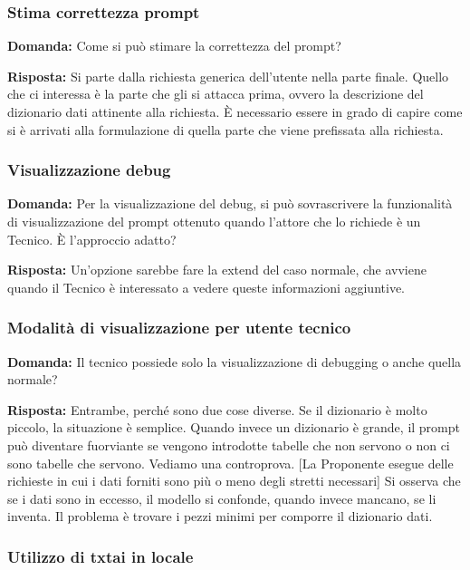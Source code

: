 \subsubsection{Stima correttezza prompt}

\textbf{Domanda:} Come si può stimare la correttezza del prompt?

\textbf{Risposta:} Si parte dalla richiesta generica dell'utente nella parte finale. Quello che ci interessa è la parte che gli si attacca prima, ovvero la descrizione del dizionario dati attinente alla richiesta. È necessario essere in grado di capire come si è arrivati alla formulazione di quella parte che viene prefissata alla richiesta.

\subsubsection{Visualizzazione debug}

\textbf{Domanda:} Per la visualizzazione del debug, si può sovrascrivere la funzionalità di visualizzazione del prompt ottenuto quando l’attore che lo richiede è un Tecnico. È l’approccio adatto?

\textbf{Risposta:} Un’opzione sarebbe fare la extend del caso normale, che avviene quando il Tecnico è interessato a vedere queste informazioni aggiuntive.


\subsubsection{Modalità di visualizzazione per utente tecnico}

\textbf{Domanda:} Il tecnico possiede solo la visualizzazione di debugging o anche quella normale?


\textbf{Risposta:} Entrambe, perché sono due cose diverse. Se il dizionario è molto piccolo, la situazione è semplice. Quando invece un dizionario è grande, il prompt può diventare fuorviante se vengono introdotte tabelle che non servono o non ci sono tabelle che servono. Vediamo una controprova.
[La Proponente esegue delle richieste in cui i dati forniti sono più o meno degli stretti necessari]
Si osserva che se i dati sono in eccesso, il modello si confonde, quando invece mancano, se li inventa. Il problema è trovare i pezzi minimi per comporre il dizionario dati.

\subsubsection{Utilizzo di txtai in locale}

